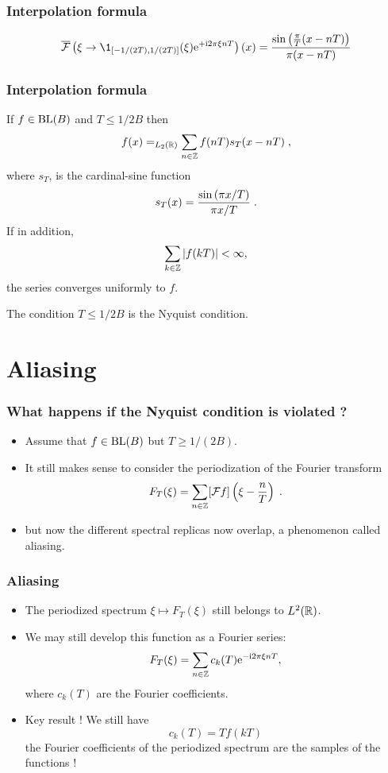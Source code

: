 \begin{frame}
\frametitle{Interpolation formula}
\begin{lemma}
$$
\TFAC{\xi \to \1_{[-1/(2T),1/(2T)]}(\xi) \rme^{+ \rmi 2 \pi \xi n T}}(x)= \frac{\sin\left( \frac{\pi}{T}(x - nT)\right)}{\pi(x-nT)}
$$
\end{lemma}


\end{frame}

\begin{frame}
\frametitle{Interpolation formula}
\begin{theorem}
If $f \in \mathrm{BL}(B)$ and $T \leq 1/2B$ then
\alert{
\begin{equation*}
f(x) =_{L_2(\mathbb{R})} \sum_{n \in \mathbb{Z}} f(nT) s_T(x-nT)  \;,
\end{equation*}
}
where $s_T$, is the cardinal-sine function
\alert{
$$
s_T(x) = \frac{\sin \left( \pi x/T\right) }{ \pi x/T}\;.
$$
}
If in addition,
$$
\sum_{k \in \mathbb{Z}} |f(kT)| < \infty,
$$
the series converges uniformly to $f$.
\end{theorem}
The condition  \alert{$T \leq 1/2B$} is the \alert{Nyquist condition}.
\end{frame}

\section{Aliasing}
\begin{frame}
\frametitle{What happens if the Nyquist condition is violated ?}
\begin{itemize}
\item Assume that $f \in \mathrm{BL}(B)$ but $T \geq 1/(2B)$.
\item It still makes sense to consider the periodization of the Fourier transform
$$
F_T (\xi) = \sum_{n \in \mathbb{Z}} [\mathcal{F} f] \left( \xi - \frac{n}{T} \right) \;.
$$
\item \alert<2>{but now the different spectral replicas now overlap, a phenomenon called aliasing.}
\end{itemize}
\end{frame}

\begin{frame}
\frametitle{Aliasing}
\begin{itemize}
\item The periodized spectrum $\xi \mapsto F_T(\xi)$ still belongs to $L^2(\mathbb{R})$.
\item We may still develop this function as a Fourier series:
\begin{equation*}
F_T (\xi) =  \sum_{n \in \mathbb{Z}} c_k(T) \mathrm{e}^{- \mathrm{i} 2 \pi \xi n T},
\end{equation*}
where $c_k(T)$ are the Fourier coefficients.
\item \alert{Key result !} We still have
\[
c_k(T)= T f(kT)
\]
the Fourier coefficients of the periodized spectrum are the samples of the functions !
\end{itemize}
\end{frame}

